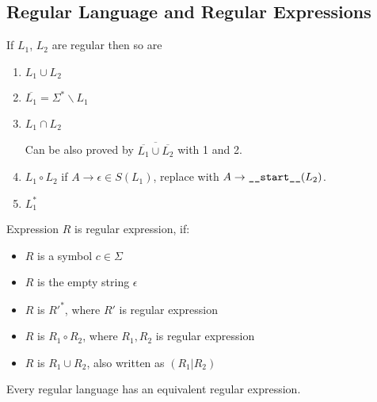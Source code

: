 \subsection{Regular Language and Regular Expressions}

If \(L_1\), \(L_2\) are regular then so are

\begin{enumerate}
\def\labelenumi{\arabic{enumi}.}
\item
  \(L_1\cup L_2\)
\item
  \(\overline{L_1}=\Sigma^* \backslash L_1\)
\item
  \(L_1 \cap L_2\)

  Can be also proved by
  \(\overline{\overline{L_1} \cup \overline{L_2}}\) with 1 and 2.
\item
  \(L_1\circ L_2\) if \(A \rightarrow \epsilon \in S(L_1)\), replace
  with \(A \rightarrow \text{\texttt{\_\_start\_\_}}(L_2)\).
\item
  \(L_1^*\)
\end{enumerate}

\begin{definition}
Expression $R$ is regular expression, if:
\begin{itemize}
\item
  $R$ is a symbol \(c \in \Sigma\)
\item
  $R$ is the empty string \(\epsilon\)
\item
  $R$ is \(R'^*\), where \(R'\) is regular expression
\item
  $R$ is \(R_1\circ R_2\), where \(R_1,R_2\) is regular expression
\item
  $R$ is \(R_1 \cup R_2\), also written as \((R_1 | R_2)\)
\end{itemize}
\end{definition}

\begin{theorem}[Kleene]
Every regular language has an equivalent regular
expression.
\end{theorem}
